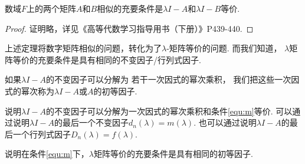 \begin{theorem}
	数域$F$上的两个矩阵$A$和$B$相似的充要条件是$\lambda I-A$和$\lambda I-B$等价.
\end{theorem}
\begin{proof}
	证明略，详见《高等代数学习指导用书（下册）》P439-440.
\end{proof}
上述定理将数字矩阵相似的问题，转化为了$\lambda$-矩阵等价的问题.
而我们知道，
$\lambda$矩阵等价的充要条件是具有相同的不变因子/行列式因子.

\begin{definition}
	如果$\lambda I-A$的不变因子可以分解为
	若干一次因式的幂次乘积，
	我们把这些一次因式的幂次称为$\lambda I-A$或$A$的初等因子.
\end{definition}

\begin{remark}
	说明$\lambda I-A$的不变因子可以分解为一次因式的幂次乘积和条件\eqref{equ:m}等价. 可以通过说明$\lambda I-A$的最后一个不变因子$d_n(\lambda) = m(\lambda)$. 也可以通过说明$\lambda I-A$的最后一个行列式因子$D_n(\lambda) = f(\lambda)$.
\end{remark}
\vspace{4cm}

\begin{remark}
	说明在条件\eqref{equ:m}下，$\lambda$矩阵等价的充要条件是具有相同的初等因子.
\end{remark}
\vspace{3cm}

